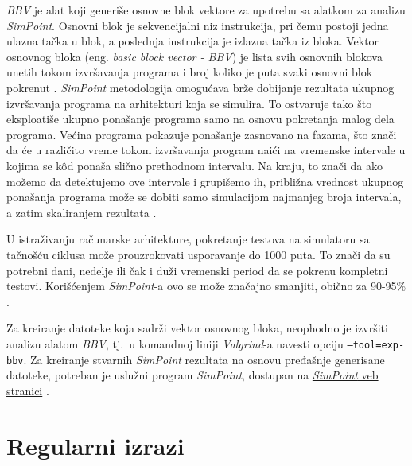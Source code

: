 \documentclass[12pt,oneside]{memoir}
\theoremstyle{plain}
\theoremstyle{definition}
\begin{document}
\textit{BBV} je alat koji generiše osnovne blok vektore za upotrebu sa alatkom za analizu \textit{SimPoint}. Osnovni blok je sekvencijalni niz instrukcija, pri čemu postoji jedna ulazna tačka u blok, a poslednja instrukcija je izlazna tačka iz bloka. Vektor osnovnog bloka (eng. \textit{basic block vector - BBV}) je lista svih osnovnih blokova unetih tokom izvršavanja programa i broj koliko je puta svaki osnovni blok pokrenut \cite{BBV}. \textit{SimPoint} metodologija omogućava brže dobijanje rezultata ukupnog izvršavanja programa na arhitekturi koja se simulira. To ostvaruje tako što eksploatiše ukupno ponašanje programa samo na osnovu pokretanja malog dela programa. Većina programa pokazuje ponašanje zasnovano na fazama, što znači da će u različito vreme tokom izvršavanja program naići na vremenske intervale u kojima se k\^od ponaša slično prethodnom intervalu. Na kraju, to znači da ako možemo da detektujemo ove intervale i grupišemo ih, približna vrednost ukupnog ponašanja programa može se dobiti samo simulacijom najmanjeg broja intervala, a zatim skaliranjem rezultata \cite{BBV}.

U istraživanju računarske arhitekture, pokretanje testova na simulatoru sa tačnošću ciklusa može prouzrokovati usporavanje do 1000 puta. To znači da su potrebni dani, nedelje ili čak i duži vremenski period da se pokrenu kompletni testovi. Korišćenjem \textit{SimPoint}-a ovo se može značajno smanjiti, obično za 90-95\% \cite{BBV}.

Za kreiranje datoteke koja sadrži vektor osnovnog bloka, neophodno je izvršiti analizu alatom \textit{BBV}, tj.~u komandnoj liniji \textit{Valgrind}-a navesti opciju \texttt{--tool=exp-bbv}. Za kreiranje stvarnih \textit{SimPoint} rezultata na osnovu pređašnje generisane datoteke, potreban je uslužni program \textit{SimPoint}, dostupan na \href{http://cseweb.ucsd.edu/~calder/simpoint/}{\textit{SimPoint} veb stranici} \cite{BBV}.  

\chapter{Regularni izrazi}

\end{document}
